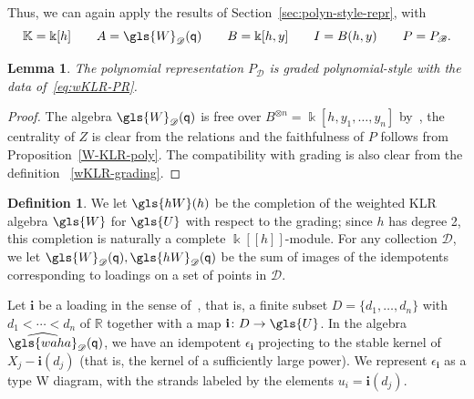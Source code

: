 \documentclass[10pt]{article}
\newtheorem{lemma}[theorem]{Lemma}
\theoremstyle{definition}
\newtheorem{defi}[theorem]{Definition}
\newcommand{\Bi}{\mathbf{i}}
\newcommand{\pq}{\mathsf{q}}
\newcommand{\K}{\Bbbk}%
\newcommand{\R}{\mathbb{R}}
\newcommand{\waha}{\gls{waha}}
\newcommand\llbracket{[\![}
\newcommand\rrbracket{]\!]}
\begin{document}
Thus, we can again apply the results of Section~\ref{sec:polyn-style-repr},
with 
\begin{equation}
\mathbb{K}=\K[h]\qquad A=\gls{W}_{\mathscr{D}}(\pq) \qquad
 B=\K[h,y]\qquad I=B(h,y)\qquad P=P_{\mathscr{B}}.\label{eq:wKLR-PR}
\end{equation}

\begin{lemma}
 The polynomial representation $P_{\mathscr{D}}$ is graded polynomial-style
 with the data of~\eqref{eq:wKLR-PR}. 
\end{lemma}
\begin{proof}
 The algebra $\gls{W}_{\mathscr{D}}(\pq) $ is free over $B^{\otimes
 n}=\K[h,y_1,\dots, y_n]$ by~\cite[Thm.~2.8]{WebwKLR}, the
 centrality of $Z$ is clear from the relations and the faithfulness
 of $P$ follows from Proposition~\ref{W-KLR-poly}. The compatibility
 with grading is also clear from the definition
~\eqref{wKLR-grading}. 
\end{proof}

\begin{defi}\label{def:hW}
We let $\gls{hW}(h)$ be the completion of the weighted KLR algebra
$\gls{W}$ for $\gls{U}$
with respect to the grading; since $h$ has degree 2, this completion
is naturally a complete $\K\llbracket h\rrbracket $-module. For any collection $\mathscr{D}$, we let
$\gls{W}_{\mathscr{D}}(\pq),\gls{hW}_{\mathscr{D}}(\pq)$ be the sum of images of
the idempotents corresponding to loadings on a set of points in $\mathscr{D}$.
\end{defi} 

Let $\Bi$ be a loading in
the sense of~\cite{WebwKLR}, that is, a finite subset $D=\{d_1,\dots, d_n\}$ with
$d_1<\cdots <d_n$ of $\R$
together with a map $\Bi\colon D\to \gls{U}$.
In the algebra $\widehat{\waha}_{\mathscr{D}}(\pq)$, we have an idempotent
$\epsilon_{\Bi}$ projecting to the stable kernel of $X_j-\Bi(d_j)$
(that is, the kernel of a sufficiently large power). 
We represent $\epsilon_{\Bi}$ as a type W
diagram, with the strands labeled by the elements
$u_i=\Bi(d_j)$. 
\end{document}
